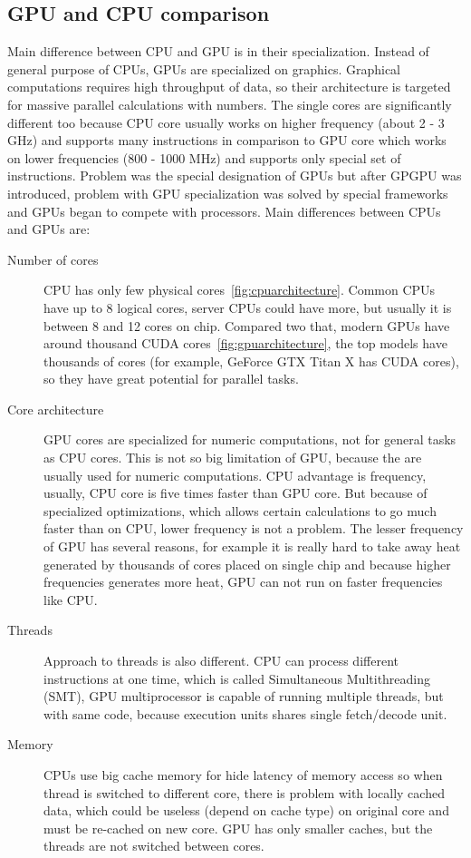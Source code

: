\subsection{GPU and CPU comparison} \label{ssec:gpucpucomparison}
Main difference between CPU and GPU is in their specialization. Instead of general purpose of CPUs, GPUs are specialized on graphics. Graphical computations requires high throughput of data, so their architecture is targeted for massive parallel calculations with numbers. The single cores are significantly different too because CPU core usually works on higher frequency (about 2 - 3 GHz) and supports many instructions in comparison to GPU core which works on lower frequencies (800 - 1000 MHz) and supports only special set of instructions. Problem was the special designation of GPUs but after GPGPU was introduced, problem with GPU specialization was solved by special frameworks and GPUs began to compete with processors. Main differences between CPUs and GPUs are:
\begin{description}
\item[Number of cores] CPU has only few physical cores~\autoref{fig:cpuarchitecture}. Common CPUs have up to 8 logical cores, server CPUs could have more, but usually it is between 8 and 12 cores on chip. Compared two that, modern GPUs have around thousand CUDA cores~\autoref{fig:gpuarchitecture}, the top models have thousands of cores (for example, GeForce GTX Titan X has CUDA cores), so they have great potential for parallel tasks.
\item[Core architecture] GPU cores are specialized for numeric computations, not for general tasks as CPU cores. This is not so big limitation of GPU, because the are usually used for numeric computations. CPU advantage is frequency, usually, CPU core is five times faster than GPU core. But because of specialized optimizations, which allows certain calculations to go much faster than on CPU, lower frequency is not a problem. The lesser frequency of GPU has several reasons, for example it is really hard to take away heat generated by thousands of cores placed on single chip and  because higher frequencies generates more heat, GPU can not run on faster frequencies like CPU.
\item[Threads] Approach to threads is also different. CPU can process different instructions at one time, which is called Simultaneous Multithreading (SMT), GPU multiprocessor is capable of running multiple threads, but with same code, because execution units shares single fetch/decode unit.
\item[Memory] CPUs use big cache memory for hide latency of memory access so when thread is switched to different core, there is problem with locally cached data, which could be useless (depend on cache type) on original core and must be re-cached on new core. GPU has only smaller caches, but the threads are not switched between cores.
\end{description}

